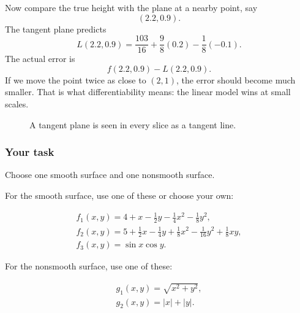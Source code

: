 Now compare the true height with the plane at a nearby point, say
\[
    (2.2,0.9).
\]
The tangent plane predicts
\[
    L(2.2,0.9)
    =
    \frac{103}{16}
    +
    \frac98(0.2)
    -
    \frac18(-0.1).
\]
The actual error is
\[
    f(2.2,0.9)-L(2.2,0.9).
\]
If we move the point twice as close to \((2,1)\), the error should become much smaller.
That is what differentiability means: the linear model wins at small scales.

\begin{figure}[h]
\centering
{}
\caption{A tangent plane is seen in every slice as a tangent line.}
\end{figure}

\subsubsection*{Your task}

Choose one smooth surface and one nonsmooth surface.

For the smooth surface, use one of these or choose your own:

\[
\begin{array}{c}
f_1(x,y)=4+x-\frac12y-\frac14x^2-\frac18y^2,\\[1mm]
f_2(x,y)=5+\frac12x-\frac14y+\frac18x^2-\frac1{16}y^2+\frac18xy,\\[1mm]
f_3(x,y)=\sin x\cos y.
\end{array}
\]

For the nonsmooth surface, use one of these:

\[
\begin{array}{c}
g_1(x,y)=\sqrt{x^2+y^2},\\[1mm]
g_2(x,y)=|x|+|y|.
\end{array}
\]

